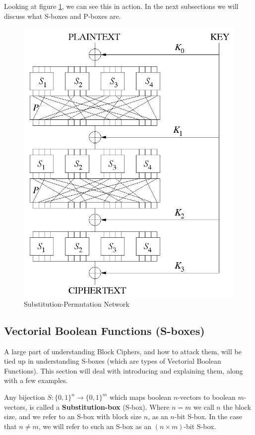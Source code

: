 Looking at figure \ref{fig:SP}, we can see this in action. In the next subsections
we will discuss what S-boxes and P-boxes are.
\begin{figure}
\begin{center}
\includegraphics[scale=0.50]{spn.png} 
\caption{Substitution-Permutation Network \cite[]{gabore}}
\label{fig:SP}
\end{center}
\end{figure}

\subsection{Vectorial Boolean Functions (S-boxes)}
A large part of understanding Block Ciphers, and how to attack them, will be
tied up in understanding S-boxes (which are types of Vectorial Boolean
Functions). This section will deal with introducing and explaining them, along
with a few examples.

\begin{defn}
Any bijection $S:\{0,1\}^n \rightarrow \{0,1\}^m$ which maps boolean
$n$-vectors to boolean $m$-vectors, is called a \textbf{Substitution-box}
(S-box). Where $n = m$ we call $n$ the block size, and we refer to an S-box
with block size $n$, as an $n$-bit S-box. In the case that $n \neq m$,
we will refer to such an S-box as an $(n \times m)$-bit S-box.
\end{defn}

